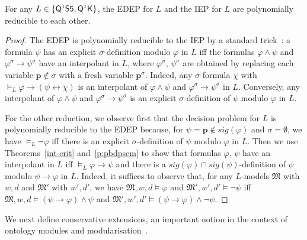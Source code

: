 \documentclass{lmcs} %
\theoremstyle{plain}\newtheorem{satz}[thm]{Satz} %
\newcommand{\sig}{\mathit{sig}}
\newcommand{\QSF}{\ensuremath{\smash{\mathsf{Q^1S5}}}}
\newcommand{\QK}{\ensuremath{\smash{\mathsf{Q^1K}}}}
\newcommand{\fform}[1]{\boldsymbol{#1}}
\newcommand{\pvar}{\fform{p}}
\begin{document}
\begin{thm}\label{p:cipvspbdp}
For any $L \in \{\QSF, \QK\}$, the EDEP for $L$ and the IEP for $L$ are polynomially reducible to each other.
\end{thm}
%
\begin{proof}
The	EDEP is polynomially reducible to the IEP by a standard trick~\cite{MGabbay2005-MGAIAD}: a formula $\psi$ has an explicit $\sigma$-definition modulo $\varphi$ in $L$ iff the formulas $\varphi \land \psi$ and $\varphi^\sigma \to \psi^\sigma$ have an interpolant in $L$, where $\varphi^\sigma$, $\psi^\sigma$ are obtained by replacing each variable $\pvar \notin \sigma$ with a fresh variable $\pvar^\sigma$. Indeed, any $\sigma$-formula $\chi$ with $\models_L\varphi\to(\psi\leftrightarrow\chi)$ is an interpolant of $\varphi \land \psi$ and $\varphi^\sigma \to \psi^\sigma$ in $L$. 
	Conversely, any interpolant of $\varphi \land \psi$ and $\varphi^\sigma \to \psi^\sigma$ is an explicit $\sigma$-definition of $\psi$ modulo $\varphi$ in $L$.
	
	For the other reduction, we observe first that the decision problem for $L$ is polynomially reducible to the EDEP because, for $\psi = \pvar \notin \sig(\varphi)$ and $\sigma = \emptyset$, we have $\models_L \neg \varphi$ iff there is an explicit $\sigma$-definition of $\psi$ modulo $\varphi$ in $L$.
	Then we use Theorems~\ref{int-crit} and~\ref{p:pbdpsem} to show that formulas $\varphi$, $\psi$ have an interpolant in $L$ iff $\models_{L}\varphi\to\psi$ and there is a $\sig(\varphi) \cap \sig(\psi)$-definition of $\psi$ modulo $\psi \to \varphi$ in $L$. 
	Indeed, it suffices to observe that, for any $L$-models $\mathfrak M$ with $w,d$ and $\mathfrak M'$ with $w',d'$, we have 
	$\mathfrak M,w,d\models\varphi$ and $\mathfrak M',w',d'\models\neg\psi$ iff  
	$\mathfrak M,w,d\models (\psi\to\varphi)\land\psi$ and $\mathfrak M',w',d' \models (\psi\to\varphi)\land\neg\psi$.
\end{proof}

We next define conservative extensions, an important notion in the context of ontology modules and modularisation~\cite{GrauHKS08,DBLP:conf/rweb/BotoevaKLRWZ16}.
\end{document}
